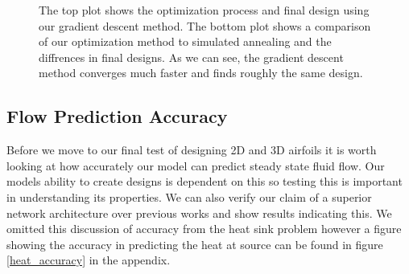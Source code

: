 \documentclass{article} %
\begin{document}
\begin{figure}[h]
\begin{center}
\end{center}
\label{heat_sink_optimization}
\caption{The top plot shows the optimization process and final design using our gradient descent method. The bottom plot shows a comparison of our optimization method to simulated annealing and the diffrences in final designs. As we can see, the gradient descent method converges much faster and finds roughly the same design. }
\end{figure}

\begin{figure}[h]
\begin{center}
\end{center}
\end{figure}


\subsection{Flow Prediction Accuracy}

Before we move to our final test of designing 2D and 3D airfoils it is worth looking at how accurately our model can predict steady state fluid flow. Our models ability to create designs is dependent on this so testing this is important in understanding its properties. We can also verify our claim of a superior network architecture over previous works and show results indicating this. We omitted this discussion of accuracy from the heat sink problem however a figure showing the accuracy in predicting the heat at source can be found in figure \ref{heat_accuracy} in the appendix.
\end{document}
